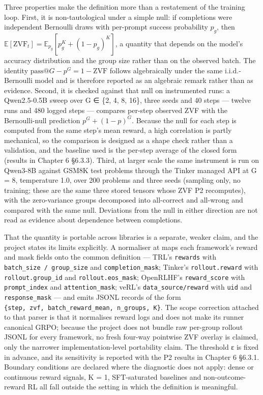 \documentclass[12pt,a4paper]{report}
\DeclareRobustCommand{\longtok}[1]{\texttt{\seqsplit{#1}}}
\begin{document}
Three properties make the definition more than a restatement of the
training loop. First, it is non-tautological under a simple null: if
completions were independent Bernoulli draws with per-prompt success
probability \(p_g\), then
\(\mathbb{E}[\mathrm{ZVF}_t] = \mathbb{E}_{p_g}[p_g^K + (1-p_g)^K]\), a
quantity that depends on the model's accuracy distribution and the group
size rather than on the observed batch. The identity
\(\mathrm{pass@}G - p^G = 1 - \mathrm{ZVF}\) follows algebraically under
the same i.i.d.-Bernoulli model and is therefore reported as an
algebraic remark rather than as evidence. Second, it is checked against
that null on instrumented runs: a Qwen2.5-0.5B sweep over G ∈ \{2, 4, 8,
16\}, three seeds and 40 steps --- twelve runs and 480 logged steps ---
compares per-step observed ZVF with the Bernoulli-null prediction
\(p^G + (1-p)^G\). Because the null for each step is computed from the
same step's mean reward, a high correlation is partly mechanical, so the
comparison is designed as a shape check rather than a validation, and
the baseline used is the per-step average of the closed form (results in
Chapter 6 §6.3.3). Third, at larger scale the same instrument is run on
Qwen3-8B against GSM8K test problems through the Tinker managed API at G
= 8, temperature 1.0, over 200 problems and three seeds (sampling only,
no training; these are the same three stored tensors whose ZVF P2
recomputes), with the zero-variance groups decomposed into all-correct
and all-wrong and compared with the same null. Deviations from the null
in either direction are not read as evidence about dependence between
completions.

That the quantity is portable across libraries is a separate, weaker
claim, and the project states its limits explicitly. A normaliser at
\longtok{platform\_modal/scripts/zvf\_\allowbreak{}compute\_\allowbreak{}cross\_\allowbreak{}framework.py} maps
each framework's reward and mask fields onto the common definition ---
TRL's \texttt{rewards} with \texttt{batch\_size\ /\ group\_size} and
\texttt{completion\_mask}; Tinker's \texttt{rollout.reward} with
\texttt{rollout.group\_id} and \texttt{rollout.eos\_mask}; OpenRLHF's
\texttt{reward\_score} with \texttt{prompt\_index} and
\texttt{attention\_mask}; veRL's \texttt{data\_source/reward} with
\texttt{uid} and \texttt{response\_mask} --- and emits JSONL records of
the form \texttt{\{step,\allowbreak{}\ zvf,\allowbreak{}\ batch\_\allowbreak{}\allowbreak{}reward\_\allowbreak{}\allowbreak{}mean,\allowbreak{}\ n\_\allowbreak{}groups,\allowbreak{}\ K\}}.
The scope correction attached to that parser is that it normalises
reward logs and does not make its runner canonical GRPO; because the
project does not bundle raw per-group rollout JSONL for every framework,
no fresh four-way pointwise ZVF overlay is claimed, only the narrower
implementation-level portability claim. The threshold ε is fixed in
advance, and its sensitivity is reported with the P2 results in Chapter
6 §6.3.1. Boundary conditions are declared where the diagnostic does not
apply: dense or continuous reward signals, K = 1, SFT-saturated
baselines and non-outcome-reward RL all fall outside the setting in
which the definition is meaningful.
\end{document}
